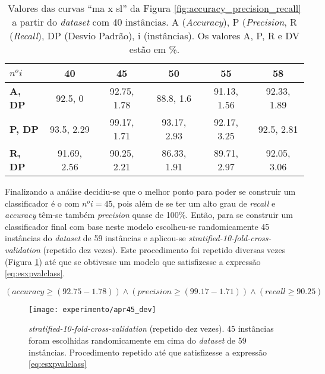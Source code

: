 \begin{table}[!htp]
  \centering
  \begin{tabular}{ |l|c c c c c|}
    \hline
       {\bf \textbf{$n^o i$}} & {\bf 40} & {\bf 45} & {\bf 50} & {\bf 55} & {\bf 58} \\
    \hline
       \textbf{A, DP} & 92.5, 0 & 92.75, 1.78 & 88.8, 1.6 & 91.13, 1.56 & 92.33, 1.89 \\
    \hline
       \textbf{P, DP} & 93.5, 2.29 & 99.17, 1.71 & 93.17, 2.93 &  92.17, 3.25 & 92.5, 2.81 \\
    \hline
       \textbf{R, DP} & 91.69, 2.56 & 90.25, 2.21 & 86.33, 1.91 & 89.71, 2.97 & 92.05, 3.06 \\
    \hline
  \end{tabular}
  \caption{Valores das curvas ``ma x sl'' da Figura \ref{fig:accuracy_precision_recall} a partir do \textit{dataset} com 40 instâncias. A (\textit{Accuracy}), P (\textit{Precision}, R (\textit{Recall}), DP (Desvio Padrão), i (instâncias). Os valores A, P, R e DV estão em \%.}
  \label{table:valorescurva}
\end{table}

Finalizando a análise decidiu-se que o melhor ponto para poder se construir um classificador é o com $n^o i = 45$, pois além de se ter um alto grau de \textit{recall} e \textit{accuracy} têm-se também \textit{precision} quase de 100\%. Então, para se construir um classificador final com base neste modelo escolheu-se randomicamente 45 instâncias do \textit{dataset} de 59 instâncias e aplicou-se \textit{stratified-10-fold-cross-validation} (repetido dez vezes). Este procedimento foi repetido diversas vezes (Figura \ref{fig:apr45_dev}) até que se obtivesse um modelo que satisfizesse a expressão \ref{eq:esxpvalclass}.

\begin{equation}
  (\textit{accuracy} \geq (92.75-1.78)) \wedge (\textit{precision} \geq (99.17-1.71)) \wedge (\textit{recall} \geq 90.25)
  \label{eq:esxpvalclass}
\end{equation}

\begin{figure}[!htb] \centering 
  \centering
  \texttt{[image: experimento/apr45\_dev]} 
  \caption{\textit{stratified-10-fold-cross-validation} (repetido dez vezes). 45 instâncias foram escolhidas randomicamente em cima do \textit{dataset} de 59 instâncias. Procedimento repetido até que satisfizesse a expressão \ref{eq:esxpvalclass} } 
  \label{fig:apr45_dev}
\end{figure}

